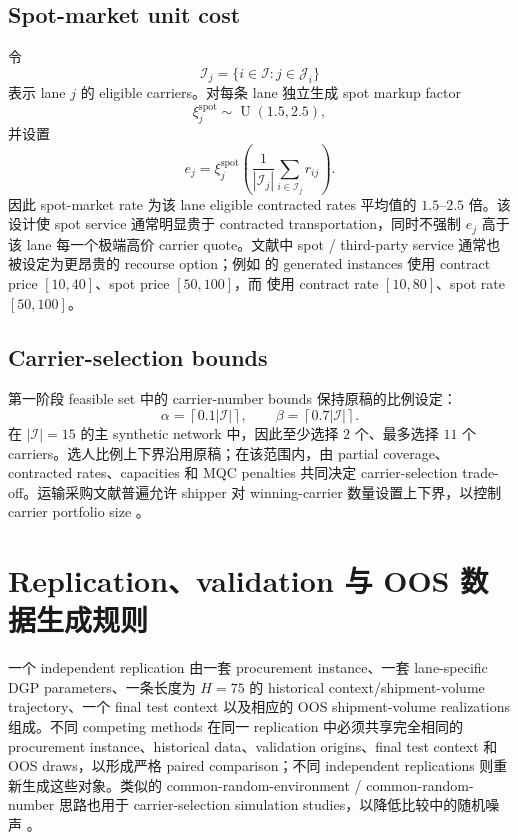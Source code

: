 \documentclass[11pt,a4paper]{ctexart}
\newcommand{\I}{\mathcal I}
\newcommand{\J}{\mathcal J}
\newcommand{\U}{\operatorname{U}}
\begin{document}
\subsection{Spot-market unit cost}

令
\[
\I_j=\{i\in\I:j\in\J_i\}
\]
表示 lane $j$ 的 eligible carriers。对每条 lane 独立生成 spot markup factor
\[
\xi_j^{\mathrm{spot}}\sim \U(1.5,2.5),
\]
并设置
\[
e_j=
\xi_j^{\mathrm{spot}}
\left(
\frac{1}{|\I_j|}\sum_{i\in\I_j}r_{ij}
\right).
\]
因此 spot-market rate 为该 lane eligible contracted rates 平均值的 $1.5$--$2.5$ 倍。该设计使 spot service 通常明显贵于 contracted transportation，同时不强制 $e_j$ 高于该 lane 每一个极端高价 carrier quote。文献中 spot / third-party service 通常也被设定为更昂贵的 recourse option；例如 \citet{remli2019} 的 generated instances 使用 contract price $[10,40]$、spot price $[50,100]$，而 \citet{li2023} 使用 contract rate $[10,80]$、spot rate $[50,100]$。

\subsection{Carrier-selection bounds}

第一阶段 feasible set 中的 carrier-number bounds 保持原稿的比例设定：
\[
\alpha=\left\lceil0.1|\I|\right\rceil,
\qquad
\beta=\left\lceil0.7|\I|\right\rceil.
\]
在 $|\I|=15$ 的主 synthetic network 中，因此至少选择 $2$ 个、最多选择 $11$ 个 carriers。选人比例上下界沿用原稿；在该范围内，由 partial coverage、contracted rates、capacities 和 MQC penalties 共同决定 carrier-selection trade-off。运输采购文献普遍允许 shipper 对 winning-carrier 数量设置上下界，以控制 carrier portfolio size \citep{ma2010,remli2013,li2023}。

\section{Replication、validation 与 OOS 数据生成规则}

一个 independent replication 由一套 procurement instance、一套 lane-specific DGP parameters、一条长度为 $H=75$ 的 historical context/shipment-volume trajectory、一个 final test context 以及相应的 OOS shipment-volume realizations组成。不同 competing methods 在同一 replication 中必须共享完全相同的 procurement instance、historical data、validation origins、final test context 和 OOS draws，以形成严格 paired comparison；不同 independent replications 则重新生成这些对象。类似的 common-random-environment / common-random-number 思路也用于 carrier-selection simulation studies，以降低比较中的随机噪声 \citep{feki2016}。
\end{document}
